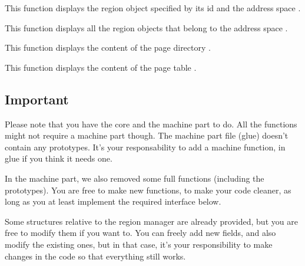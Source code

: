 {
  This function displays the region object specified by its id 
  and the address space .
}

{
  This function displays all the region objects that belong to the address
  space .
}

{
  This function displays the content of the page directory .
}

{
  This function displays the content of the page table .
}

\subsection*{Important}
Please note that you have the core and the machine part to do.
All the functions might not require a machine part though. The machine
part file (glue) doesn't contain any prototypes.
It's your responsability to add a machine function, in glue if you think
it needs one.

\-

In the machine part, we also removed some full functions (including the prototypes). You are free to make new functions, to make your code cleaner, as long as you at least implement the required interface below.

\-

Some structures relative to the region manager are already provided, but you
are free to modify them if you want to. You can freely add new fields, and also
modify the existing ones, but in that case, it's your responsibility to make
changes in the code so that everything still works.
